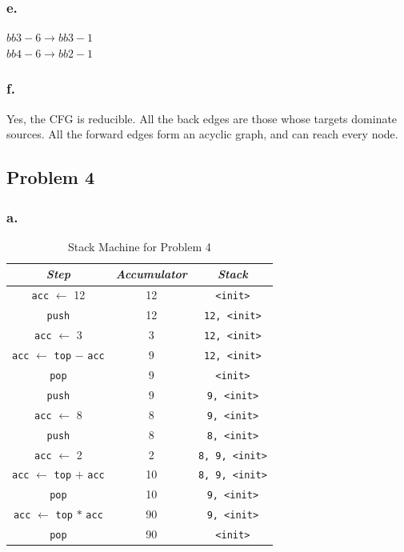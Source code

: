 \documentclass{article}
\begin{document}
	\subsubsection*{e.}
	$bb3-6 \to bb3-1$\\
	$bb4-6 \to bb2-1$
	
	\subsubsection*{f.}
Yes, the CFG is reducible. All the back edges are those whose targets dominate sources. All the forward edges form an acyclic graph, and can reach every node.
	
	\newpage
	\subsection*{Problem 4}
	\subsubsection*{a.}
	\begin{table}[h!]
		\begin{center}
		 \caption{Stack Machine for Problem 4}
			\begin{tabular}{ |c|c|c|} 
				 \toprule
				\textit{Step} & \textit{Accumulator} & \textit{Stack}\\
				\midrule
				\texttt{acc} $\leftarrow$ 12 & 12 & \texttt{<init>}\\
				\texttt{push} & 12 & \texttt{12, <init>}\\
				\texttt{acc} $\leftarrow$ 3 & 3 & \texttt{12, <init>}\\
				\texttt{acc} $\leftarrow$  \texttt{top} $-$  \texttt{acc} & 9 & \texttt{12, <init>}\\
				\texttt{pop} & 9 & \texttt{<init>}\\
				\texttt{push} & 9 & \texttt{9, <init>}\\
				\texttt{acc} $\leftarrow$ 8 & 8 & \texttt{9, <init>}\\
				\texttt{push} & 8 & \texttt{8, <init>}\\
				\texttt{acc} $\leftarrow$ 2 & 2 & \texttt{8, 9, <init>}\\
				\texttt{acc} $\leftarrow$  \texttt{top} $+$  \texttt{acc} & 10 & \texttt{8, 9, <init>}\\
				\texttt{pop} & 10 & \texttt{9, <init>}\\
				\texttt{acc} $\leftarrow$  \texttt{top} $*$  \texttt{acc} & 90 & \texttt{9, <init>}\\
				\texttt{pop} & 90 & \texttt{<init>}\\
				\bottomrule
			\end{tabular}
		\end{center}
	\end{table}

	
\end{document}
